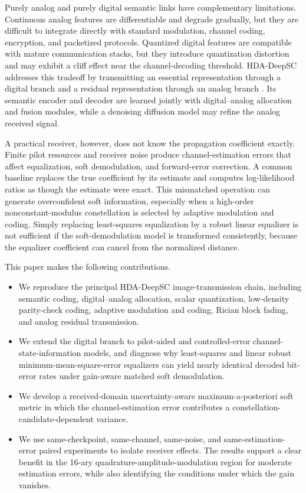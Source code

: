 \documentclass[conference]{IEEEtran}
\begin{document}
Purely analog and purely digital semantic links have complementary limitations. Continuous analog features are differentiable and degrade gradually, but they are difficult to integrate directly with standard modulation, channel coding, encryption, and packetized protocols. Quantized digital features are compatible with mature communication stacks, but they introduce quantization distortion and may exhibit a cliff effect near the channel-decoding threshold. HDA-DeepSC addresses this tradeoff by transmitting an essential representation through a digital branch and a residual representation through an analog branch \cite{xie2025hda}. Its semantic encoder and decoder are learned jointly with digital--analog allocation and fusion modules, while a denoising diffusion model may refine the analog received signal.

A practical receiver, however, does not know the propagation coefficient exactly. Finite pilot resources and receiver noise produce channel-estimation errors that affect equalization, soft demodulation, and forward-error correction. A common baseline replaces the true coefficient by its estimate and computes log-likelihood ratios as though the estimate were exact. This mismatched operation can generate overconfident soft information, especially when a high-order nonconstant-modulus constellation is selected by adaptive modulation and coding. Simply replacing least-squares equalization by a robust linear equalizer is not sufficient if the soft-demodulation model is transformed consistently, because the equalizer coefficient can cancel from the normalized distance.

This paper makes the following contributions.
\begin{itemize}
    \item We reproduce the principal HDA-DeepSC image-transmission chain, including semantic coding, digital--analog allocation, scalar quantization, low-density parity-check coding, adaptive modulation and coding, Rician block fading, and analog residual transmission.
    \item We extend the digital branch to pilot-aided and controlled-error channel-state-information models, and diagnose why least-squares and linear robust minimum-mean-square-error equalizers can yield nearly identical decoded bit-error rates under gain-aware matched soft demodulation.
    \item We develop a received-domain uncertainty-aware maximum-a-posteriori soft metric in which the channel-estimation error contributes a constellation-candidate-dependent variance.
    \item We use same-checkpoint, same-channel, same-noise, and same-estimation-error paired experiments to isolate receiver effects. The results support a clear benefit in the 16-ary quadrature-amplitude-modulation region for moderate estimation errors, while also identifying the conditions under which the gain vanishes.
\end{itemize}
\end{document}
